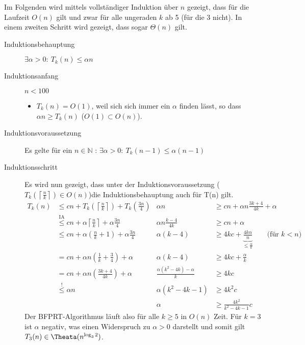 \documentclass[a4paper,10pt]{scrartcl}
\begin{document}
Im Folgenden wird mittels vollständiger Induktion über $n$ gezeigt, dass für die Laufzeit $O(n)$ gilt und zwar für alle ungeraden $k$ ab 5 (für die 3 nicht). In einem zweiten Schritt wird gezeigt, dass sogar $\Theta(n)$ gilt.
\begin{description}
\item[Induktionsbehauptung] $\exists\alpha > 0{:}\ T_k(n) \leq \alpha n$
\item[Induktionsanfang] $n < 100$
    \begin{itemize}
     \item $T_k(n) = O(1)$, weil sich sich immer ein $\alpha$ finden lässt, so dass $\alpha n \geq T_k(n)$ ($O(1) \subset O(n)$).
    \end{itemize}
\item[Induktionsvoraussetzung] Es gelte für ein $n \in \mathbb{N}$ : $\exists\alpha > 0{:}\ T_k(n-1) \leq \alpha (n-1)$

\item[Induktionsschritt] Es wird nun gezeigt, dass unter der Induktionsvoraussetzung ($T_k\left(\left\lceil\frac{n}{k}\right\rceil\right) \in O(n)$)die Induktionsbehauptung auch für T(n) gilt.
\[
\begin{array}{rl|rl}
 T_k(n)   &\leq cn + T_k\left(\left\lceil\frac{n}{k}\right\rceil\right) + T_k\left(\frac{3n}{4}\right) &
                \alpha n &\geq cn + \alpha n \frac{3k + 4}{4k} + \alpha\\
        &\overset{\text{IA}}{\leq} cn + \alpha \left\lceil\frac{n}{k}\right\rceil + \alpha \frac{3n}{4} &
                \alpha n \frac{k - 4}{4k} &\geq cn + \alpha\\
        &\leq cn + \alpha \left(\frac{n}{k} + 1\right) + \alpha \frac{3n}{4} &
                \alpha (k - 4) &\geq 4kc + \underbrace{\frac{4k\alpha}{n}}_{\leq \frac{\alpha}{k}} \qquad \text{(für $k < n$)} \\
        &= cn + \alpha n \left(\frac{1}{k} + \frac{3}{4}\right) + \alpha  &
                \alpha (k - 4) &\geq 4kc + \frac{\alpha}{k}\\
        &= cn + \alpha n \left(\frac{3k + 4}{4k}\right) + \alpha &
                \frac{\alpha (k^2 - 4k) - \alpha}{k} &\geq 4kc\\
        &\overset{!}{\leq} \alpha n &
                \alpha (k^2 - 4k - 1) &\geq 4k^2c\\
        && \alpha &\geq \frac{4k^2}{k^2 - 4k - 1} c
\end{array}
\]
 Der BFPRT-Algorithmus läuft also für alle  $k \ge 5$ in $O(n)$ Zeit. Für $k = 3$ ist $\alpha$ negativ, was einen Widerspruch zu $\alpha > 0$ darstellt und somit gilt $T_3(n) \in \Theata(n^{\log_3 2})$.
\end{description}
\end{document}
